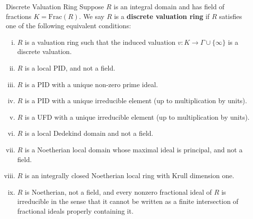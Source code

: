 \begin{definition}{Discrete Valuation Ring}{}
    Suppose $R$ is an integral domain and has field of fractions $K=\mathrm{Frac}\left(R\right)$. We say $R$ is a \textbf{discrete valuation ring} if $R$ satisfies one of the following equivalent conditions:
    \begin{enumerate}[(i)]
        \item $R$ is a valuation ring such that the induced valuation $v:K\to \Gamma\cup\{\infty\}$ is a discrete valuation.
        \item $R$ is a local PID, and not a field.
        \item $R$ is a PID with a unique non-zero prime ideal.
        \item $R$ is a PID with a unique irreducible element (up to multiplication by units).
        \item $R$ is a UFD with a unique irreducible element (up to multiplication by units).
        \item $R$ is a local Dedekind domain and not a field.
        \item $R$ is a Noetherian local domain whose maximal ideal is principal, and not a field. 
        \item $R$ is an integrally closed Noetherian local ring with Krull dimension one.
        \item $R$ is Noetherian, not a field, and every nonzero fractional ideal of $R$ is irreducible in the sense that it cannot be written as a finite intersection of fractional ideals properly containing it.
    \end{enumerate}
\end{definition}


